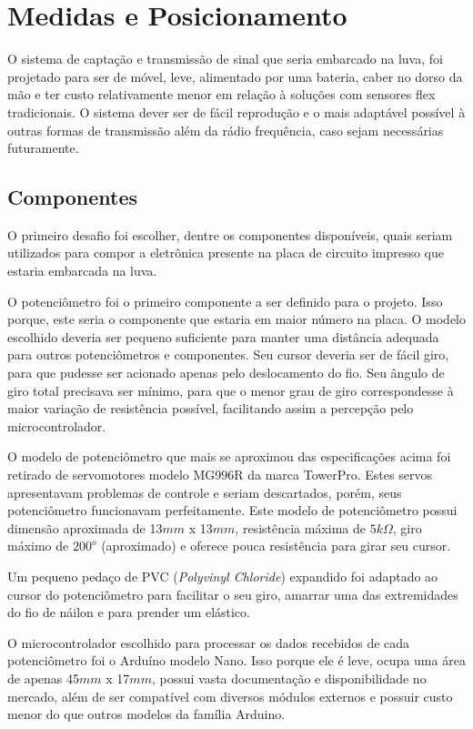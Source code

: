 \documentclass[
	12pt,				%
	openright,			%
	oneside,			%
	a4paper,			%
	english,			%
	brazil				%
	]{abntex2}
\begin{document}
		\section{Medidas e Posicionamento}	

			O sistema de captação e transmissão de sinal que seria embarcado na luva, foi projetado para ser de móvel, leve, alimentado por uma bateria, caber no dorso da mão e ter custo relativamente menor em relação à soluções com sensores flex tradicionais. O sistema dever ser de fácil reprodução e o mais adaptável possível à outras formas de transmissão além da rádio frequência, caso sejam necessárias futuramente.

			\subsection{Componentes}

			O primeiro desafio foi escolher, dentre os componentes disponíveis, quais seriam utilizados para compor a eletrônica presente na placa de circuito impresso que estaria embarcada na luva.

			O potenciômetro foi o primeiro componente a ser definido para o projeto. Isso porque, este seria o componente que estaria em maior número na placa. O modelo escolhido deveria ser pequeno suficiente para manter uma distância adequada para outros potenciômetros e componentes. Seu cursor deveria ser de fácil giro, para que pudesse ser acionado apenas pelo deslocamento do fio. Seu ângulo de giro total precisava ser mínimo, para que o menor grau de giro correspondesse à maior variação de resistência possível, facilitando assim a percepção pelo microcontrolador.

			O modelo de potenciômetro que mais se aproximou das especificações acima foi retirado de servomotores modelo MG996R da marca TowerPro. Estes servos apresentavam problemas de controle e seriam descartados, porém, seus potenciômetro funcionavam perfeitamente. Este modelo de potenciômetro possui dimensão aproximada de 13$mm$ x 13$mm$, resistência máxima de $5k\Omega$, giro máximo de $200^{o}$ (aproximado) e oferece pouca resistência para girar seu cursor. 

			Um pequeno pedaço de PVC (\textit{Polyvinyl Chloride}) expandido foi adaptado ao cursor do potenciômetro para facilitar o seu giro, amarrar uma das extremidades do fio de náilon e para prender um elástico.

			O microcontrolador escolhido para processar os dados recebidos de cada potenciômetro foi o Arduíno modelo Nano. Isso porque ele é leve, ocupa uma área de apenas 45$mm$ x 17$mm$, possui vasta documentação e disponibilidade no mercado, além de ser compatível com diversos módulos externos e possuir custo menor do que outros modelos da família Arduino.
\end{document}
